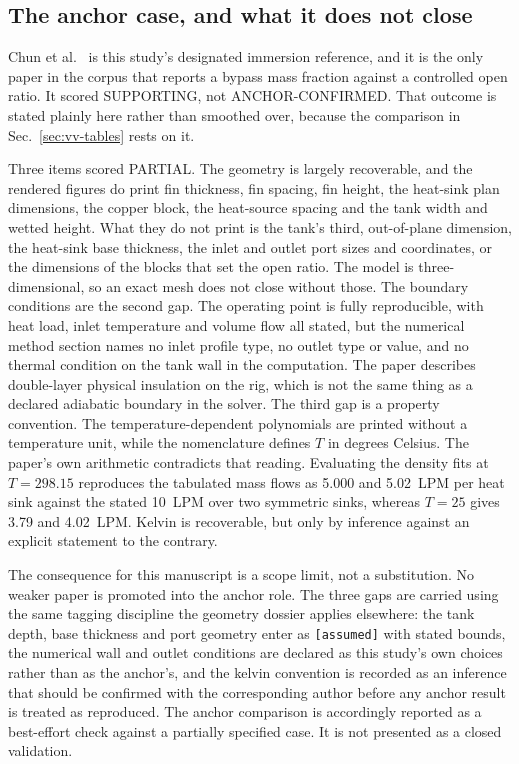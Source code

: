 \subsection{The anchor case, and what it does not close}
\label{sec:vv-anchor}

Chun et al.~\cite{chun2026} is this study's designated immersion reference, and it is the only
paper in the corpus that reports a bypass mass fraction against a controlled open ratio. It scored
SUPPORTING, not ANCHOR-CONFIRMED. That outcome is stated plainly here rather than smoothed over,
because the comparison in Sec.~\ref{sec:vv-tables} rests on it.

Three items scored PARTIAL. The geometry is largely recoverable, and the rendered figures do print
fin thickness, fin spacing, fin height, the heat-sink plan dimensions, the copper block, the
heat-source spacing and the tank width and wetted height. What they do not print is the tank's
third, out-of-plane dimension, the heat-sink base thickness, the inlet and outlet port sizes and
coordinates, or the dimensions of the blocks that set the open ratio. The model is
three-dimensional, so an exact mesh does not close without those. The boundary conditions are the
second gap. The operating point is fully reproducible, with heat load, inlet temperature and volume
flow all stated, but the numerical method section names no inlet profile type, no outlet type or
value, and no thermal condition on the tank wall in the computation. The paper describes
double-layer physical insulation on the rig, which is not the same thing as a declared adiabatic
boundary in the solver. The third gap is a property convention. The temperature-dependent
polynomials are printed without a temperature unit, while the nomenclature defines $T$ in degrees
Celsius. The paper's own arithmetic contradicts that reading. Evaluating the density fits at
$T = 298.15$ reproduces the tabulated mass flows as 5.000 and 5.02~LPM per heat sink against the
stated 10~LPM over two symmetric sinks, whereas $T = 25$ gives 3.79 and 4.02~LPM. Kelvin is
recoverable, but only by inference against an explicit statement to the contrary.

The consequence for this manuscript is a scope limit, not a substitution. No weaker paper is
promoted into the anchor role. The three gaps are carried using the same tagging discipline the
geometry dossier applies elsewhere: the tank depth, base thickness and port geometry enter as
\texttt{[assumed]} with stated bounds, the numerical wall and outlet conditions are declared as
this study's own choices rather than as the anchor's, and the kelvin convention is recorded as an
inference that should be confirmed with the corresponding author before any anchor result is
treated as reproduced. The anchor comparison is accordingly reported as a best-effort check
against a partially specified case. It is not presented as a closed validation.


